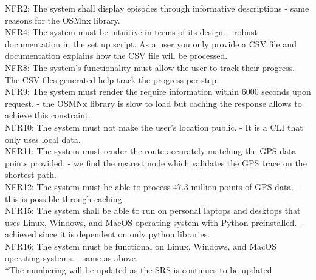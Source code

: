 \documentclass[12pt, titlepage]{article}
\begin{document}
\noindent NFR2: The system shall display episodes through informative descriptions - same reasons for the OSMnx library.\\

\noindent NFR4: The system must be intuitive in terms of its design. - robust documentation in the set up script. As a user you only provide a CSV file and documentation explains how the CSV file will be processed.\\

\noindent NFR8: The system’s functionality must allow the user to track their progress. - The CSV files generated help track the progress per step. \\

\noindent NFR9: The system must render the require information within 6000 seconds upon request. - the OSMNx library is slow to load but caching the response allows to achieve this constraint.\\

\noindent NFR10: The system must not make the user’s location public. - It is a CLI that only uses local data. \\

\noindent NFR11: The system must render the route accurately matching the GPS data points provided. - we find the nearest node which validates the GPS trace on the shortest path.\\

\noindent NFR12: The system must be able to process 47.3 million points of GPS data. - this is possible through caching.\\

\noindent NFR15: The system shall be able to run on personal laptops and desktops that uses Linux, Windows, and MacOS operating system with Python preinstalled. - achieved since it is dependent on only python libraries.\\

\noindent NFR16: The system must be functional on Linux, Windows, and MacOS operating systems. - same as above.\\


*The numbering will be updated as the SRS is continues to be updated

\newpage 
\end{document}
